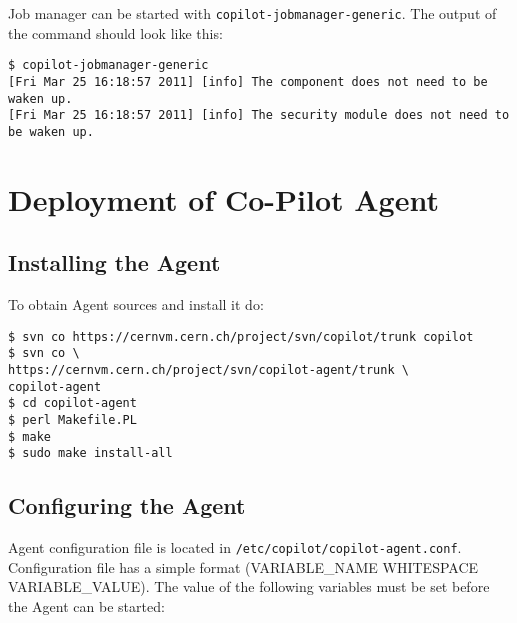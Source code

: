 Job manager can be started with \texttt{copilot-jobmanager-generic}. The output of the command should look like this:

\lstset{caption=Starting \copilot Generic Job Manager}
\begin{lstlisting}
$ copilot-jobmanager-generic
[Fri Mar 25 16:18:57 2011] [info] The component does not need to be waken up.
[Fri Mar 25 16:18:57 2011] [info] The security module does not need to be waken up.

\end{lstlisting}

\section{Deployment of Co-Pilot Agent}

\subsection{Installing the Agent}
To obtain Agent sources and install it do:

\lstset{caption=\copilot Agent installation}
\begin{lstlisting}
$ svn co https://cernvm.cern.ch/project/svn/copilot/trunk copilot
$ svn co \
https://cernvm.cern.ch/project/svn/copilot-agent/trunk \
copilot-agent
$ cd copilot-agent
$ perl Makefile.PL
$ make
$ sudo make install-all
\end{lstlisting}

\subsection{Configuring the Agent}
Agent configuration file is located in \texttt{/etc/copilot/copilot-agent.conf}. Configuration file has a simple format (VARIABLE\_NAME WHITESPACE VARIABLE\_VALUE).
The value of the following variables must be set before the Agent can be started:

